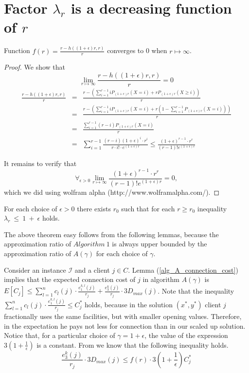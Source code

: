 \documentclass{llncs}
\begin{document}
\section{Factor $\lambda_r$ is a decreasing function of $r$}
\label{r_vs_apx}

\begin{lemma}
\label{technical_lemma}
 Function $f(r) = \frac{r - h((1+\epsilon)r, r)}{r}$ converges to 0 when $r \mapsto \infty$.
\end{lemma}

\begin{proof}
We show that 
$$\lim_{r \mapsto \infty} \frac{r - h((1+\epsilon)r, r)}{r} = 0$$
\begin{eqnarray*}
\frac{r - h((1+\epsilon)r, r)}{r} &=& 
\frac{r - (\sum_{i = 1}^{r-1}iP_{(1+\epsilon)r}(X = i) + r P_{(1+\epsilon)r}(X \geq i))}{r} \nonumber \\
& = &\frac{r - (\sum_{i = 1}^{r-1}iP_{(1+\epsilon)r}(X = i) + r (1 - \sum_{i = 1}^{r-1}P_{(1+\epsilon)r}(X = i)))}{r} \nonumber \\
& = &\frac{\sum_{i = 1}^{r-1} (r-i) P_{(1+\epsilon)r}(X = i) }{r} \nonumber \\
& = &\sum_{i = 1}^{r-1} \frac{(r-i) (1+\epsilon)^i \cdot r^i }{r\cdot i! \cdot e^{(1+\epsilon)r}} \leq \frac{(1+\epsilon)^{r-1} \cdot r^r}{(r-1)!e^{(1+\epsilon)r}} \nonumber
\end{eqnarray*}

It remains to verify that $$\forall_{\epsilon > 0} \lim_{r \mapsto \infty} \frac{(1+\epsilon)^{r-1} \cdot r^r}{(r-1)!e^{(1+\epsilon)r}} = 0,$$ 
which we did using wolfram alpha (http://www.wolframalpha.com/).
\end{proof}

\begin{theorem}
\label{apx_r_relation}
 For each choice of $\epsilon > 0$ there exists $r_0$ such that for each $r \geq r_0$ inequality $\lambda_r~\leq~1~+~\epsilon$ holds.
\end{theorem}
The above theorem easy follows from the following lemmas, because the approximation ratio of $Algorithm~1$ is always upper bounded by the approximation ratio of $A(\gamma)$ for each choice of $\gamma$.

Consider an instance $\mathcal{I}$ and a client $j \in C$. Lemma (\ref{alg_A_connection_cost}) implies that the expected connection cost of $j$ in algorithm $A(\gamma)$ is $E[C_j] \leq \sum_{l = 1}^{n} c_l(j) \cdot \frac{e_1^{k,l}(j)}{r_j} + \frac{e_3^{k}(j)}{r_j} \cdot 3 D_{max}(j)$. Note that the inequality $\sum_{l = 1}^{n} c_l(j) \cdot \frac{e_1^{k,l}(j)}{r_j} \leq C_j^*$ holds, because in the solution $(x^*, y^*)$ client $j$ fractionally uses the same facilities, but with smaller opening values. Therefore, in the expectation he pays not less for connection than in our scaled up solution. Notice that, for a particular choice of $\gamma = 1 + \epsilon$, the value of the expression $3 (1 + \frac{1}{\epsilon})$ is a constant. From \cite{Aravind} we know that the following inequality holds. $$\frac{e_3^{k}(j)}{r_j} \cdot 3 D_{max}(j) \leq f(r) \cdot 3 (1 + \frac{1}{\epsilon}) C_j^*$$
\end{document}
